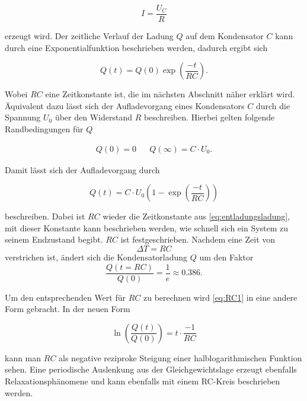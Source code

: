 \begin{equation}
    \label{eq:ohmschesgesetz}
    I = \frac{U_C}{R}
\end{equation}

erzeugt wird. 
Der zeitliche Verlauf der Ladung $Q$ auf dem Kondensator $C$ kann durch eine Exponentialfunktion beschrieben werden, dadurch ergibt sich

\begin{equation}
    \label{eq:entladungsladung}
    Q (t) = Q (0) \exp{\left(\frac{-t}{RC} \right)}.
\end{equation}

Wobei $RC$ eine Zeitkonstante ist, die im nächsten Abschnitt näher erklärt wird. \cite{V353}
Äquivalent dazu lässt sich der Aufladevorgang eines Kondensators $C$ durch die Spannung $U_0$ über den Widerstand $R$ beschreiben. Hierbei gelten folgende Randbedingungen für $Q$

\begin{align}
    \label{eq:ladung}
    Q (0) = 0 && Q (\infty) = C \cdot U_0.
\end{align}

Damit lässt sich der Aufladevorgang durch

\begin{equation}
    \label{eq:aufladungsladung}
    Q (t) = C \cdot U_0  (1- \exp{\left(\frac{-t}{RC} \right)} )
\end{equation}

beschreiben. \cite{V353} Dabei ist $RC$ wieder die Zeitkonstante aus \autoref{eq:entladungsladung}, mit dieser Konstante kann beschrieben werden, wie schnell sich ein System zu seinem Endzustand begibt. $RC$ ist festgeschrieben. Nachdem eine Zeit von 
\begin{equation}
    \Delta T = RC
\end{equation} verstrichen ist, ändert sich die Kondensatorladung $Q$ um den Faktor
\begin{equation}
    \label{eq:RC1}
    \frac{Q (t = RC)}{Q (0)} = \frac{1}{e} \approx 0.386.
\end{equation}

Um den entsprechenden Wert für $RC$ zu berechnen wird \autoref{eq:RC1} in eine andere Form gebracht. In der neuen Form

\begin{equation}
    \label{eq:RC2}
    \ln \left( \frac{Q (t)}{Q (0)} \right) = t \cdot \frac{-1}{RC}
\end{equation}

kann man $RC$ als negative reziproke Steigung einer halblogarithmischen Funktion sehen.\cite{V353}
Eine periodische Auslenkung aus der Gleichgewichtslage erzeugt ebenfalls Relaxationsphänomene und kann ebenfalls mit einem RC-Kreis beschrieben werden. 

